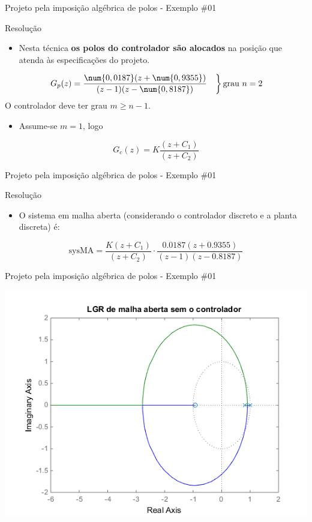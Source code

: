 \begin{frame}{Projeto pela imposição algébrica de polos - Exemplo \#01}
\begin{block}{Resolução}
\begin{itemize}
    \item Nesta técnica \textbf{os polos do controlador são alocados} na posição que atenda às especificações do projeto.
\end{itemize}
	\[ \left. \begin{aligned}
	G_p(z)&=\frac{\num{0,0187}(z+\num{0,9355})}{(z-1)(z-\num{0,8187})}
	\end{aligned}\right\rbrace \text{grau $ n=2 $} \]
\centering
O controlador deve ter grau $ m\geqslant n-1 $.
\vspace{0.4cm}
\begin{itemize}
    \item Assume-se $ m=1 $, logo
\end{itemize}
\[ G_c(z)=K\dfrac{(z+C_1)}{(z+C_2)} \]
\end{block}
\end{frame}

\begin{frame}{Projeto pela imposição algébrica de polos - Exemplo \#01}
\begin{block}{Resolução}
\begin{itemize}
    \item O sistema em malha aberta (considerando o controlador discreto e a planta discreta) é:
\end{itemize}

	\[ \text{sysMA}=\frac{K(z+C_1)}{(z+C_2)}\cdot\frac{\num{0,0187}(z+\num{0,9355})}{(z-1)(z-\num{0,8187})} \]
\end{block}
\end{frame}

\begin{frame}{Projeto pela imposição algébrica de polos - Exemplo \#01}
\centerline{\includegraphics[width=0.8\linewidth]{Figuras/Ch11/fig10.png}}
\end{frame}

